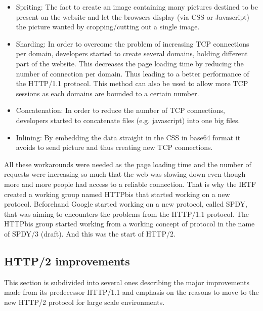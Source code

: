\begin{itemize}
\item Spriting: The fact to create an image containing many pictures destined to be present on the website and let the browsers display (via CSS or Javascript) the picture wanted by cropping/cutting out a single image.
\item Sharding: In order to overcome the problem of increasing TCP connections per domain, developers started to create several domains, holding different part of the website. This decreases the page loading time by reducing the number of connection per domain. Thus leading to a better performance of the HTTP/1.1 protocol. This method can also be used to allow more TCP sessions as each domains are bounded to a certain number.
\item Concatenation: In order to reduce the number of TCP connections, developers started to concatenate files (e.g. javascript) into one big files. 
\item Inlining: By embedding the data straight in the CSS in base64 format it avoids to send picture and thus creating new TCP connections. 
\end{itemize}
All these workarounds were needed as the page loading time and the number of requests were increasing so much that the web was slowing down even though more and more people had access to a reliable connection. That is why the IETF created a working group named HTTPbis\cite{httpbis} that started working on a new protocol. Beforehand Google started working on a new protocol, called SPDY\cite{spdy}, that was aiming to encounters the problems from the HTTP/1.1 protocol. The HTTPbis group started working from a working concept of protocol in the name of SPDY/3 (draft). And this was the start of HTTP/2.

\subsection{HTTP/2 improvements}
This section is subdivided into several ones describing the major improvements made from its predecessor HTTP/1.1 and emphasis on the reasons to move to the new HTTP/2 protocol for large scale environments. 


